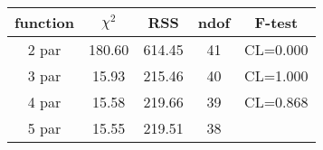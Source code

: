 \begin{tabular}{c|c|c|c|c}
function & $\chi^2$ & RSS & ndof & F-test \\
\hline
2 par & 180.60 & 614.45 & 41 & CL=0.000 \\
3 par & 15.93 & 215.46 & 40 & CL=1.000 \\
4 par & 15.58 & 219.66 & 39 & CL=0.868 \\
5 par & 15.55 & 219.51 & 38 & \\
\hline
\end{tabular}